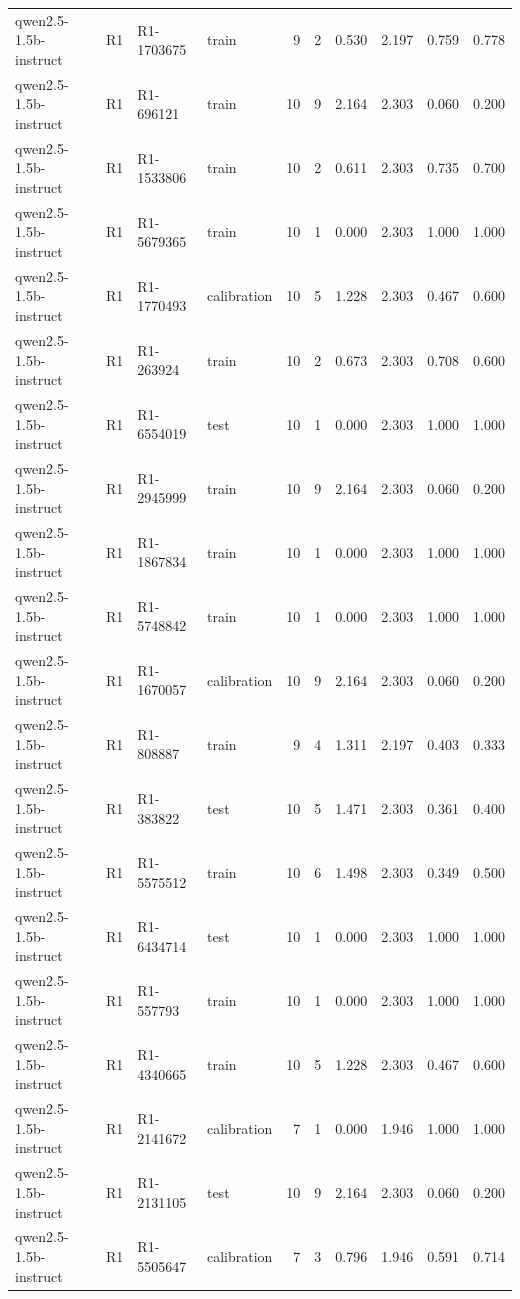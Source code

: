 \begin{table}
\begin{tabular}{llllrrrrrr}
qwen2.5-1.5b-instruct & R1 & R1-1703675 & train & 9 & 2 & 0.530 & 2.197 & 0.759 & 0.778 \\
qwen2.5-1.5b-instruct & R1 & R1-696121 & train & 10 & 9 & 2.164 & 2.303 & 0.060 & 0.200 \\
qwen2.5-1.5b-instruct & R1 & R1-1533806 & train & 10 & 2 & 0.611 & 2.303 & 0.735 & 0.700 \\
qwen2.5-1.5b-instruct & R1 & R1-5679365 & train & 10 & 1 & 0.000 & 2.303 & 1.000 & 1.000 \\
qwen2.5-1.5b-instruct & R1 & R1-1770493 & calibration & 10 & 5 & 1.228 & 2.303 & 0.467 & 0.600 \\
qwen2.5-1.5b-instruct & R1 & R1-263924 & train & 10 & 2 & 0.673 & 2.303 & 0.708 & 0.600 \\
qwen2.5-1.5b-instruct & R1 & R1-6554019 & test & 10 & 1 & 0.000 & 2.303 & 1.000 & 1.000 \\
qwen2.5-1.5b-instruct & R1 & R1-2945999 & train & 10 & 9 & 2.164 & 2.303 & 0.060 & 0.200 \\
qwen2.5-1.5b-instruct & R1 & R1-1867834 & train & 10 & 1 & 0.000 & 2.303 & 1.000 & 1.000 \\
qwen2.5-1.5b-instruct & R1 & R1-5748842 & train & 10 & 1 & 0.000 & 2.303 & 1.000 & 1.000 \\
qwen2.5-1.5b-instruct & R1 & R1-1670057 & calibration & 10 & 9 & 2.164 & 2.303 & 0.060 & 0.200 \\
qwen2.5-1.5b-instruct & R1 & R1-808887 & train & 9 & 4 & 1.311 & 2.197 & 0.403 & 0.333 \\
qwen2.5-1.5b-instruct & R1 & R1-383822 & test & 10 & 5 & 1.471 & 2.303 & 0.361 & 0.400 \\
qwen2.5-1.5b-instruct & R1 & R1-5575512 & train & 10 & 6 & 1.498 & 2.303 & 0.349 & 0.500 \\
qwen2.5-1.5b-instruct & R1 & R1-6434714 & test & 10 & 1 & 0.000 & 2.303 & 1.000 & 1.000 \\
qwen2.5-1.5b-instruct & R1 & R1-557793 & train & 10 & 1 & 0.000 & 2.303 & 1.000 & 1.000 \\
qwen2.5-1.5b-instruct & R1 & R1-4340665 & train & 10 & 5 & 1.228 & 2.303 & 0.467 & 0.600 \\
qwen2.5-1.5b-instruct & R1 & R1-2141672 & calibration & 7 & 1 & 0.000 & 1.946 & 1.000 & 1.000 \\
qwen2.5-1.5b-instruct & R1 & R1-2131105 & test & 10 & 9 & 2.164 & 2.303 & 0.060 & 0.200 \\
qwen2.5-1.5b-instruct & R1 & R1-5505647 & calibration & 7 & 3 & 0.796 & 1.946 & 0.591 & 0.714 \\

\end{tabular}
\end{table}
